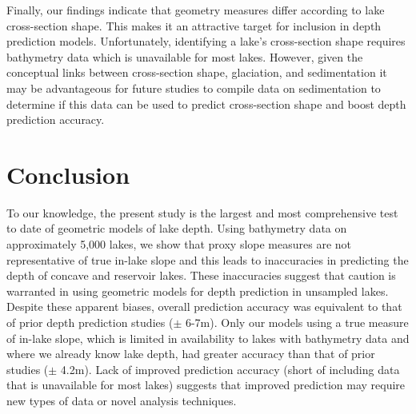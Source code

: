 \documentclass[draft]{agujournal2019}
\begin{document}
Finally, our findings indicate that geometry measures differ according to lake cross-section shape. This makes it an attractive target for inclusion in depth prediction models. Unfortunately, identifying a lake’s cross-section shape requires bathymetry data which is unavailable for most lakes. However, given the conceptual links between cross-section shape, glaciation, and sedimentation \cite{johanssonNewApproachesModelling2007} it may be advantageous for future studies to compile data on sedimentation to determine if this data can be used to predict cross-section shape and boost depth prediction accuracy.

\section{Conclusion}
\noindent
To our knowledge, the present study is the largest and most comprehensive test to date of geometric models of lake depth. Using bathymetry data on approximately 5,000 lakes, we show that proxy slope measures are not representative of true in-lake slope and this leads to inaccuracies in predicting the depth of concave and reservoir lakes. These inaccuracies suggest that caution is warranted in using geometric models for depth prediction in unsampled lakes. Despite these apparent biases, overall prediction accuracy was equivalent to that of prior depth prediction studies ($\pm$ 6-7m). Only our models using a true measure of in-lake slope, which is limited in availability to lakes with bathymetry data and where we already know lake depth, had greater accuracy than that of prior studies ($\pm$ 4.2m). Lack of improved prediction accuracy (short of including data that is unavailable for most lakes) suggests that improved prediction may require new types of data or novel analysis techniques.


%
%
%
%
%
%
%
%
%
%
\end{document}
